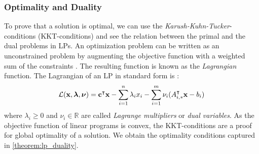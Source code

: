 \subsubsection{Optimality and Duality}
To prove that a solution is optimal, we can use the \textit{Karush-Kuhn-Tucker}-conditions (KKT-conditions) and see the relation between the primal and the dual problems in LPs. 
An optimization problem can be written as an unconstrained problem by augmenting the objective function with a weighted sum of the constraints \cite{boyd_stephen_convex_2004}. The resulting function is known as the \textit{Lagrangian} function.
The Lagrangian of an LP in standard form is \cite{noauthor_numerical_2006}: 
\begin{equation} \label{Eq:lagrangian}
\mathcal{L} (\bold x, \boldsymbol{\lambda}, \boldsymbol \nu) = \bold c^\intercal \bold x - \sum_{i=1}^n \lambda_i x_i - \sum_{i=1}^m \bold \nu_i (A_{i,*}^\intercal \bold x - b_i)
\end{equation} %
\quad where $\lambda_i \geq 0$ and $\nu_i \in \mathbb{R}$ are called \textit{Lagrange multipliers} or \textit{dual variables}.
As the objective function of linear programs is convex, the KKT-conditions are a proof for global optimality of a solution. We obtain the optimality conditions captured in \cref{theorem:lp_duality}. 


